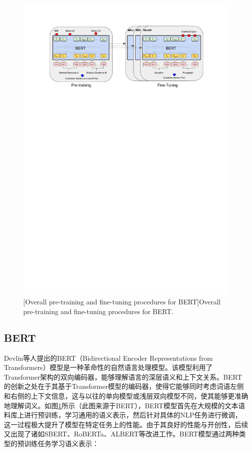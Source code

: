 \begin{figure}[h!]
  \centering
  \includegraphics[width=1.0\columnwidth]{figures/RelatedWork/BERT.pdf}
  [Overall pre-training and fine-tuning procedures for BERT]{Overall pre-training and fine-tuning procedures for BERT.}
  \label{figure2: BERT}
\end{figure}

\subsection[\hspace{-2pt}BERT]{{\heiti{} \hspace{-8pt}BERT}}\label{section2: BERT}

Devlin等人\cite{Bert}提出的BERT（Bidirectional Encoder Representations from Transformers）模型是一种革命性的自然语言处理模型。该模型利用了Transformer架构的双向编码器，能够理解语言的深层语义和上下文关系。BERT的创新之处在于其基于Transformer模型的编码器，使得它能够同时考虑词语左侧和右侧的上下文信息，这与以往的单向模型或浅层双向模型不同，使其能够更准确地理解词义。如图\ref{figure2: BERT}所示（此图来源于BERT\cite{Bert}），BERT模型首先在大规模的文本语料库上进行预训练，学习通用的语义表示，然后针对具体的NLP任务进行微调，这一过程极大提升了模型在特定任务上的性能。由于其良好的性能与开创性，后续又出现了诸如SBERT\cite{SBERT}、RoBERTa\cite{RoBERTa}、ALBERT\cite{ALBERT}等改进工作。BERT模型通过两种类型的预训练任务学习语义表示：

